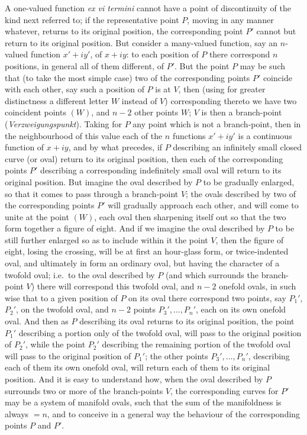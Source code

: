 \documentclass[11pt,a4paper]{book}
\begin{document}
A one-valued function \textit{ex vi termini} cannot have a point of discontinuity of the kind next referred to; if the representative point $P$, moving in any manner whatever, returns to its original position, the corresponding point $P'$ cannot but return to its original position. But consider a many-valued function, say an $n$-valued function $x' + iy'$, of $x + iy$: to each position of $P$ there correspond $n$ positions, in general all of them different, of $P'$. But the point $P$ may be such that (to take the most simple case) two of the corresponding points $P'$ coincide with each other, say such a position of $P$ is at $V$, then (using for greater distinctness a different letter $W$ instead of $V$) corresponding thereto we have two coincident points $(W)$, and $n - 2$ other points $W$; $V$ is then a branch-point (\textit{Verzweigungspunkt}). Taking for $P$ any point which is not a branch-point, then in the neighbourhood of this value each of the $n$ functions $x' + iy'$ is a continuous function of $x + iy$, and by what precedes, if $P$ describing an infinitely small closed curve (or oval) return to its original position, then each of the corresponding points $P'$ describing a corresponding indefinitely small oval will return to its original position. But imagine the oval described by $P$ to be gradually enlarged, so that it comes to pass through a branch-point $V$; the ovals described by two of the corresponding points $P'$ will gradually approach each other, and will come to unite at the point $(W)$, each oval then sharpening itself out so that the two form together a figure of eight. And if we imagine the oval described by $P$ to be still further enlarged so as to include within it the point $V$, then the figure of eight, losing the crossing, will be at first an hour-glass form, or twice-indented oval, and ultimately in form an ordinary oval, but having the character of a twofold oval; i.e.\ to the oval described by $P$ (and which surrounds the branch-point $V$) there will correspond this twofold oval, and $n - 2$ onefold ovals, in such wise that to a given position of $P$ on its oval there correspond two points, say $P_{1}'$, $P_{2}'$, on the twofold oval, and $n - 2$ points $P_{3}', \ldots, P_{n}'$, each on its own onefold oval. And then as $P$ describing its oval returns to its original position, the point $P_{1}'$ describing a portion only of the twofold oval, will pass to the original position of $P_{2}'$, while the point $P_{2}'$ describing the remaining portion of the twofold oval will pass to the original position of $P_{1}'$; the other points $P_{3}', \ldots, P_{n}'$, describing each of them its own onefold oval, will return each of them to its original position. And it is easy to understand how, when the oval described by $P$ surrounds two or more of the branch-points $V$, the corresponding curves for $P'$ may be a system of manifold ovals, such that the sum of the manifoldness is always $= n$, and to conceive in a general way the behaviour of the corresponding points $P$ and $P'$.
\end{document}
